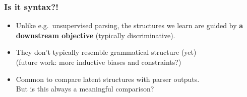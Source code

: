 \begin{frame}
\frametitle{Is it syntax?!}
\begin{itemize}
\item Unlike e.g.\ unsupervised parsing, the structures we learn are guided by
\textbf{a downstream objective} (typically discriminative).
\item<+-> They don't typically resemble grammatical structure (yet)
\citep{isitsyntax}\\
\quad(future work: more inductive biases and constraints?)
\item<+-> Common to compare latent structures with parser outputs. \\\quad But is
this always a meaningful comparison?
\end{itemize}
\end{frame}

